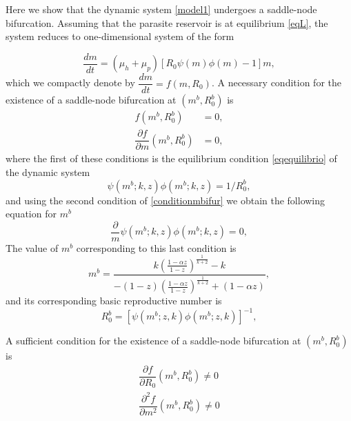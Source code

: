 \documentclass[eng]{MMSB-class-eng}
\begin{document}
{\color{red}

Here we show that the dynamic system \eqref{model1} undergoes a saddle-node bifurcation. 
Assuming that the parasite reservoir is at equilibrium \eqref{eqL}, the system reduces to one-dimensional system of the form

\begin{equation*}
\dfrac{dm}{dt}=(\mu_h + \mu_p)\left[ R_0  \psi(m)\phi(m) -1 \right] m,%
\end{equation*}
which we compactly denote by
$\dfrac{dm}{dt}=f(m,R_0)$.
A necessary condition for the existence of a saddle-node bifurcation at 
$(m^{b},R_0^b)$ is
\begin{equation}\label{conditionmbifur}
\begin{split}
f(m^b,R_0^b)&=0,\\
\dfrac{\partial f}{\partial m}(m^b,R_0^b)&=0,
\end{split}
\end{equation}
where the first of these conditions is the equilibrium condition \eqref{eqequilibrio} of the dynamic system
\begin{equation*}
\psi(m^b;k,z)\phi(m^b;k,z)=1/R_0^b,
\end{equation*}
and using the second condition of \eqref{conditionmbifur} we obtain the following equation for $m^b$
\begin{equation}
\frac{\partial }{m}\psi(m^b;k,z)\phi(m^b;k,z)=0,	
\end{equation}
The value of $m^b$ corresponding to this last condition is
\begin{equation}
m^b=\dfrac{k\left( \frac{1-\alpha z}{1-z}\right)^{\frac{1}{k+2}} - k}{-(1-z)\left( \frac{1-\alpha z}{1-z}\right)^{\frac{1}{k+2}} + (1-\alpha z)},	
\end{equation}
and its corresponding basic reproductive number is
\begin{equation}
R_0^b=\left[ \psi(m^b;z,k)\phi(m^b;z,k)\right]^{-1},
\end{equation}	

A sufficient condition for the existence of a saddle-node bifurcation at $(m^b,R_0^b)$ is
\begin{equation}
\begin{split}
\dfrac{\partial f }{\partial R_0}(m^b,R_0^b)\neq0\\
\dfrac{\partial^2 f }{\partial m^2}(m^b,R_0^b)\neq0
\end{split}
\end{equation}

}
\end{document}
